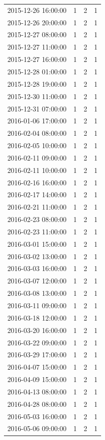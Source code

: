 \begin{tabular}{lrrr}
2015-12-26 16:00:00 & 1 & 2 & 1 \\
2015-12-26 20:00:00 & 1 & 2 & 1 \\
2015-12-27 08:00:00 & 1 & 2 & 1 \\
2015-12-27 11:00:00 & 1 & 2 & 1 \\
2015-12-27 16:00:00 & 1 & 2 & 1 \\
2015-12-28 01:00:00 & 1 & 2 & 1 \\
2015-12-28 19:00:00 & 1 & 2 & 1 \\
2015-12-30 11:00:00 & 1 & 2 & 1 \\
2015-12-31 07:00:00 & 1 & 2 & 1 \\
2016-01-06 17:00:00 & 1 & 2 & 1 \\
2016-02-04 08:00:00 & 1 & 2 & 1 \\
2016-02-05 10:00:00 & 1 & 2 & 1 \\
2016-02-11 09:00:00 & 1 & 2 & 1 \\
2016-02-11 10:00:00 & 1 & 2 & 1 \\
2016-02-16 16:00:00 & 1 & 2 & 1 \\
2016-02-17 14:00:00 & 1 & 2 & 1 \\
2016-02-21 11:00:00 & 1 & 2 & 1 \\
2016-02-23 08:00:00 & 1 & 2 & 1 \\
2016-02-23 11:00:00 & 1 & 2 & 1 \\
2016-03-01 15:00:00 & 1 & 2 & 1 \\
2016-03-02 13:00:00 & 1 & 2 & 1 \\
2016-03-03 16:00:00 & 1 & 2 & 1 \\
2016-03-07 12:00:00 & 1 & 2 & 1 \\
2016-03-08 13:00:00 & 1 & 2 & 1 \\
2016-03-11 09:00:00 & 1 & 2 & 1 \\
2016-03-18 12:00:00 & 1 & 2 & 1 \\
2016-03-20 16:00:00 & 1 & 2 & 1 \\
2016-03-22 09:00:00 & 1 & 2 & 1 \\
2016-03-29 17:00:00 & 1 & 2 & 1 \\
2016-04-07 15:00:00 & 1 & 2 & 1 \\
2016-04-09 15:00:00 & 1 & 2 & 1 \\
2016-04-13 08:00:00 & 1 & 2 & 1 \\
2016-04-28 08:00:00 & 1 & 2 & 1 \\
2016-05-03 16:00:00 & 1 & 2 & 1 \\
2016-05-06 09:00:00 & 1 & 2 & 1 \\

\end{tabular}
